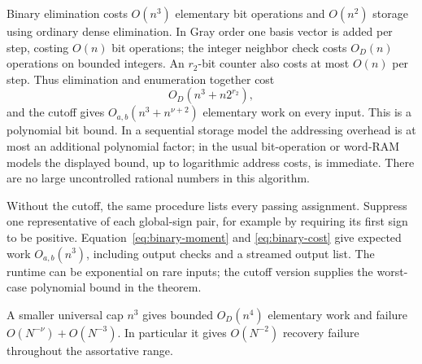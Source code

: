 Binary elimination costs $O(n^3)$ elementary bit operations and
$O(n^2)$ storage using ordinary dense elimination. In Gray order one
basis vector is added per step, costing $O(n)$ bit operations;
the integer neighbor check costs $O_D(n)$ operations on bounded
integers. An $r_2$-bit counter also costs at most $O(n)$ per step.
Thus elimination and enumeration together cost
\begin{equation}\label{eq:binary-cost}
 O_D(n^3+n2^{r_2}),
\end{equation}
and the cutoff gives $O_{a,b}(n^3+n^{\nu+2})$ elementary work on every input.
This is a polynomial bit bound. In a sequential storage model the
addressing overhead is at most an additional polynomial factor; in
the usual bit-operation or word-RAM models the displayed bound, up
to logarithmic address costs, is immediate. There are no large
uncontrolled rational numbers in this algorithm.

Without the cutoff, the same procedure lists every passing assignment.
Suppress one representative of each global-sign pair, for example by
requiring its first sign to be positive. Equation~\eqref{eq:binary-moment}
and \eqref{eq:binary-cost} give expected work
$O_{a,b}(n^3)$, including output checks and a streamed output
list. The runtime can be exponential on rare inputs; the cutoff
version supplies the worst-case polynomial bound in the theorem.


A smaller universal cap $n^3$ gives bounded $O_D(n^4)$ elementary
work and failure $O(N^{-\nu})+O(N^{-3})$. In particular it gives
$O(N^{-2})$ recovery failure throughout the assortative range.
